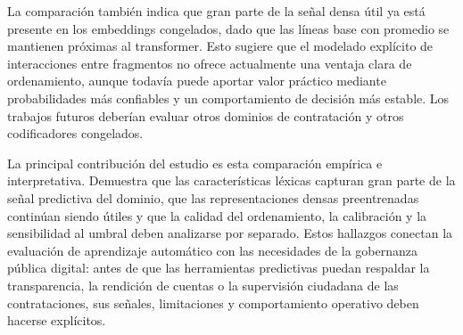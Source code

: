 La comparación también indica que gran parte de la señal densa útil ya está presente en los embeddings congelados, dado que las líneas base con promedio se mantienen próximas al transformer. Esto sugiere que el modelado explícito de interacciones entre fragmentos no ofrece actualmente una ventaja clara de ordenamiento, aunque todavía puede aportar valor práctico mediante probabilidades más confiables y un comportamiento de decisión más estable. Los trabajos futuros deberían evaluar otros dominios de contratación y otros codificadores congelados.

La principal contribución del estudio es esta comparación empírica e interpretativa. Demuestra que las características léxicas capturan gran parte de la señal predictiva del dominio, que las representaciones densas preentrenadas continúan siendo útiles y que la calidad del ordenamiento, la calibración y la sensibilidad al umbral deben analizarse por separado. Estos hallazgos conectan la evaluación de aprendizaje automático con las necesidades de la gobernanza pública digital: antes de que las herramientas predictivas puedan respaldar la transparencia, la rendición de cuentas o la supervisión ciudadana de las contrataciones, sus señales, limitaciones y comportamiento operativo deben hacerse explícitos.
